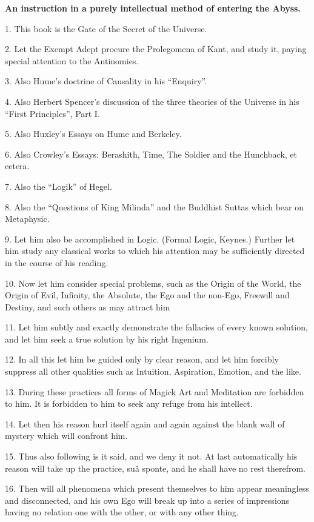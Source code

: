 \textbf{An instruction in a purely intellectual method of entering the Abyss.}


1. This book is the Gate of the Secret of the Universe.

2. Let the Exempt Adept procure the Prolegomena of Kant, and study it, paying special attention to the Antinomies.

3. Also Hume’s doctrine of Causality in his \enquote{Enquiry}.

4. Also Herbert Spencer’s discussion of the three theories of the Universe in his \enquote{First Principles}, Part I.

5. Also Huxley’s Essays on Hume and Berkeley.

6. Also Crowley’s Essays: Berashith, Time, The Soldier and the Hunchback, et cetera.

7. Also the \enquote{Logik} of Hegel.

8. Also the \enquote{Questions of King Milinda} and the Buddhist Suttas which bear on Metaphysic.

9. Let him also be accomplished in Logic. (Formal Logic, Keynes.) Further let him study any classical works to which his attention may be sufficiently directed in the course of his reading.

10. Now let him consider special problems, such as the Origin of the World, the Origin of Evil, Infinity, the Absolute, the Ego and the non-Ego, Freewill and Destiny, and such others as may attract him

11. Let him subtly and exactly demonstrate the fallacies of every known solution, and let him seek a true solution by his right Ingenium.

12. In all this let him be guided only by clear reason, and let him forcibly suppress all other qualities such as Intuition, Aspiration, Emotion, and the like.

13. During these practices all forms of Magick Art and Meditation are forbidden to him. It is forbidden to him to seek any refuge from his intellect.

14. Let then his reason hurl itself again and again against the blank wall of mystery which will confront him.

15. Thus also following is it said, and we deny it not. At last automatically his reason will take up the practice, su\^{a} sponte, and he shall have no rest therefrom.

16. Then will all phenomena which present themselves to him appear meaningless and disconnected, and his own Ego will break up into a series of impressions having no relation one with the other, or with any other thing.

